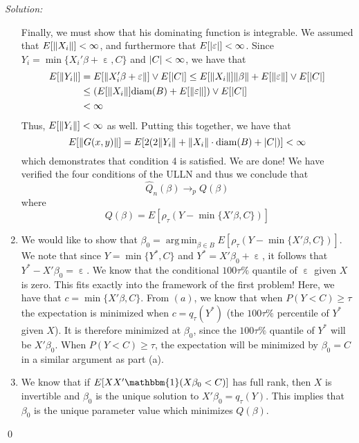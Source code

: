\documentclass[12pt]{article}
\DeclareMathOperator*{\argmin}{arg\,min}
\DeclarePairedDelimiter\norm{\lVert}{\rVert}%
\DeclareMathOperator{\eps}{\varepsilon}
\DeclarePairedDelimiter\abs{\lvert}{\rvert}%
\newenvironment{problem}[2][Problem]{\begin{trivlist}
\item[\hskip \labelsep {\bfseries #1}\hskip \labelsep {\bfseries #2.}]}{\end{trivlist}}
\newenvironment{sol}
    {\emph{Solution:}
    }
    {
    \qed
    }
\begin{document}
\begin{sol}
\begin{enumerate}[label=\alph*) ]
    Finally, we must show that his dominating function is integrable. We assumed that $E[\norm{X_i}] < \infty$, and furthermore that $E[\abs{\eps}] < \infty$. Since $Y_i = \min\{X_i'\beta + \eps, C\}$ and $\abs{C} <\infty$, we have that 
    \begin{align*}
        E[\norm{Y_i}] &= E[\norm{X_i' \beta + \eps}] \vee E[\abs{C}] \leq E[\norm{X_i}]\norm{\beta} + E[\norm{\eps}]\vee E[\abs{C}] \\
        &\leq (E[\norm{X_i}]\text{diam}(B) + E[\norm{\eps}])\vee E[\abs{C}]  \\
        &< \infty\end{align*}
    Thus, $E[\norm{Y_i}] < \infty$ as well. Putting this together, we have that
    \[E[\norm{G(x,y)}] = E[2 (2 \norm{Y_i} + \norm{X_i} \cdot \text{diam}(B) + \abs{C})] < \infty\]
    which demonstrates that condition 4 is satisfied. We are done! We have verified the four conditions of the ULLN and thus we conclude that
    \[\hat{Q}_n(\beta) \rightarrow_p Q(\beta)\]
    where 
    \[Q(\beta) = E[\rho_{\tau}(Y - \min\{X'\beta, C\})]\]
    \item We would like to show that $\beta_0 = \argmin_{\beta \in B} E[\rho_{\tau}(Y - \min\{X'\beta, C\})]$. We note that since $Y = \min\{Y^*, C\}$ and $Y^* = X'\beta_0 + \eps$, it follows that $Y^* - X'\beta_0 = \eps$. We know that the conditional $100\tau\%$ quantile of $\eps$ given $X$ is zero. This fits exactly into the framework of the first problem! Here, we have that $c = \min\{X'\beta, C\}$. From $(a)$, we know that when $P(Y < C) \geq \tau$ the expectation is minimized when $c = q_{\tau}(Y^*)$ (the $100\tau\%$ percentile of $Y^*$ given $X$). It is therefore minimized at $\beta_0$, since the $100\tau\%$ quantile of $Y^*$ will be $X'\beta_0$.
    When $P(Y < C)\geq \tau$, the expectation will be minimized by $\beta_0 = C$ in a similar argument as part (a).
\item We know that if $E[XX' \mathbbm{1}(X\beta_0 < C)]$ has full rank, then $X$ is invertible and $\beta_0$ is the unique solution to $X' \beta_0 = q_{\tau}(Y)$. This implies that $\beta_0$ is the unique parameter value which minimizes $Q(\beta)$. 
    \end{enumerate}
\end{sol}
\begin{problem}{2}
\end{problem}
\end{document}
